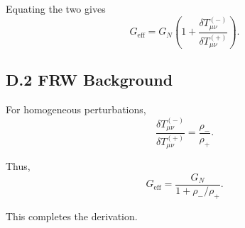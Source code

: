 \documentclass[11pt,a4paper]{article}
\begin{document}
Equating the two gives
\begin{equation}
G_{\mathrm{eff}} = G_N 
\left( 1 + \frac{\delta T_{\mu\nu}^{(-)}}{\delta T_{\mu\nu}^{(+)}} \right).
\end{equation}

\subsection*{D.2 FRW Background}

For homogeneous perturbations,
\begin{equation}
\frac{\delta T_{\mu\nu}^{(-)}}{\delta T_{\mu\nu}^{(+)}} 
= \frac{\rho_-}{\rho_+}.
\end{equation}

Thus,
\begin{equation}
G_{\mathrm{eff}} = \frac{G_N}{1 + \rho_-/\rho_+}.
\end{equation}

This completes the derivation.
\end{document}
